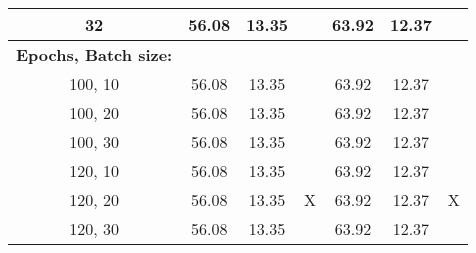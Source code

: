 \documentclass[12pt,a4paper]{article}
\begin{document}
\begin{table}[]
\begin{tabular}{ccccccc}
32                                                & 56.08                                                    & 13.35    &                                                             & 63.92                                                   & 12.37    &                                                             \\ \hline
\multicolumn{1}{l}{\textbf{Epochs, Batch size:}}  &                                                          &          &                                                             &                                                         &          &                                                             \\
100, 10                                           & 56.08                                                    & 13.35    &                                                             & 63.92                                                   & 12.37    &                                                             \\
100, 20                                           & 56.08                                                    & 13.35    &                                                             & 63.92                                                   & 12.37    &                                                             \\
100, 30                                           & 56.08                                                    & 13.35    &                                                             & 63.92                                                   & 12.37    &                                                             \\
120, 10                                           & 56.08                                                    & 13.35    &                                                             & 63.92                                                   & 12.37    &                                                             \\
120, 20                                           & 56.08                                                    & 13.35    & X                                                           & 63.92                                                   & 12.37    & X                                                           \\
120, 30                                           & 56.08                                                    & 13.35    &                                                             & 63.92                                                   & 12.37    &                                                             \\

\end{tabular}
\end{table}
\end{document}
